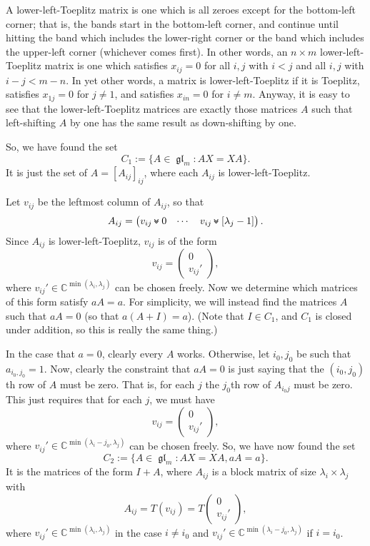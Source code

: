 \documentclass[12pt,psamsfonts]{article}
\newcommand{\leftshift}{$\,\texttt{<<}\,$}
\newcommand{\downshift}{\mathbin{\rotatebox[origin=c]{90}{\leftshift}}}
\DeclareMathOperator{\gl}{\mathfrak{gl}}
\begin{document}
A lower-left-Toeplitz matrix is one which is all zeroes except for the bottom-left corner; that is, the bands start in the bottom-left corner, and continue until hitting the band which includes the lower-right corner or the band which includes the upper-left corner (whichever comes first).
In other words, an \(n \times m\) lower-left-Toeplitz matrix is one which satisfies \(x_{ij} = 0\) for all \(i,j\) with \(i < j\) and all \(i,j\) with \(i - j < m - n\).
In yet other words, a matrix is lower-left-Toeplitz if it is Toeplitz, satisfies \(x_{1j} = 0\) for \(j \neq 1\), and satisfies \(x_{in} = 0\) for \(i \neq m\).
Anyway, it is easy to see that the lower-left-Toeplitz matrices are exactly those matrices \(A\) such that left-shifting \(A\) by one has the same result as down-shifting by one.
\par So, we have found the set 
\[C_1 := \{A \in \gl_m : AX = XA\}.\]
It is just the set of \(A = [A_{ij}]_{ij}\), where each \(A_{ij}\) is lower-left-Toeplitz.
\par Let \(v_{ij}\) be the leftmost column of \(A_{ij}\), so that
\[A_{ij} = \begin{pmatrix}
    v_{ij} \downshift 0 & \cdots & v_{ij} \downshift [\lambda_j - 1]
\end{pmatrix}.\]
Since \(A_{ij}\) is lower-left-Toeplitz, \(v_{ij}\) is of the form 
\[v_{ij} = \begin{pmatrix}
    0\\
    v_{ij}'
\end{pmatrix},\]
where \(v_{ij}' \in \mathbb{C}^{\min(\lambda_i, \lambda_j)}\) can be chosen freely.
Now we determine which matrices of this form satisfy \(aA = a\).
For simplicity, we will instead find the matrices \(A\) such that \(aA = 0\) (so that \(a(A + I) = a\)).
(Note that \(I \in C_1\), and \(C_1\) is closed under addition, so this is really the same thing.)
\par In the case that \(a = 0\), clearly every \(A\) works.
Otherwise, let \(i_0, j_0\) be such that \(a_{i_0,j_0} = 1\).
Now, clearly the constraint that \(aA = 0\) is just saying that the \((i_0,j_0)\)th row of \(A\) must be zero.
That is, for each \(j\) the \(j_0\)th row of \(A_{i_0j}\) must be zero.
This just requires that for each \(j\), we must have 
\[v_{ij} = \begin{pmatrix}
    0\\
    v_{ij}'
\end{pmatrix},\]
where \(v_{ij}' \in \mathbb{C}^{\min(\lambda_i - j_0, \lambda_j)}\) can be chosen freely.
So, we have now found the set 
\[C_2 := \{A \in \gl_m : AX = XA, aA = a\}.\]
It is the matrices of the form \(I + A\), where \(A_{ij}\) is a block matrix of size \(\lambda_i \times \lambda_j\) with 
\[A_{ij} = T(v_{ij}) = T\begin{pmatrix}
    0\\
    v_{ij}'
\end{pmatrix},\]
where \(v_{ij}' \in \mathbb{C}^{\min(\lambda_i, \lambda_j)}\) in the case \(i \neq i_0\) and \(v_{ij}' \in \mathbb{C}^{\min(\lambda_i - j_0, \lambda_j)}\) if \(i = i_0\).
\end{document}
